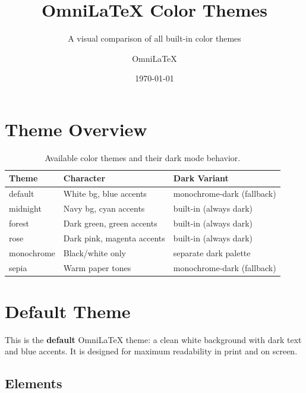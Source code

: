 \documentclass[
    language=english,
    doctype=article,
    institution=none,
    titlestyle=simple,
]{../../omnilatex}
\title{OmniLaTeX Color Themes}
\subtitle{A visual comparison of all built-in color themes}
\author{OmniLaTeX}
\date{\today}
\begin{document}
\maketitle

\tableofcontents
\newpage


\section{Theme Overview}

\begin{table}[htbp]
    \centering
    \begin{tabular}{lll}
        \textbf{Theme} & \textbf{Character} & \textbf{Dark Variant} \\
        \hline
        default    & White bg, blue accents   & monochrome-dark (fallback) \\
        midnight   & Navy bg, cyan accents    & built-in (always dark) \\
        forest     & Dark green, green accents & built-in (always dark) \\
        rose       & Dark pink, magenta accents & built-in (always dark) \\
        monochrome & Black/white only         & separate dark palette \\
        sepia      & Warm paper tones         & monochrome-dark (fallback) \\
    \end{tabular}
    \caption{Available color themes and their dark mode behavior.}
\end{table}

\newpage


\section{Default Theme}


This is the \textbf{default} OmniLaTeX theme: a clean white background with
dark text and blue accents. It is designed for maximum readability in print
and on screen.

\subsection{Elements}
\end{document}
